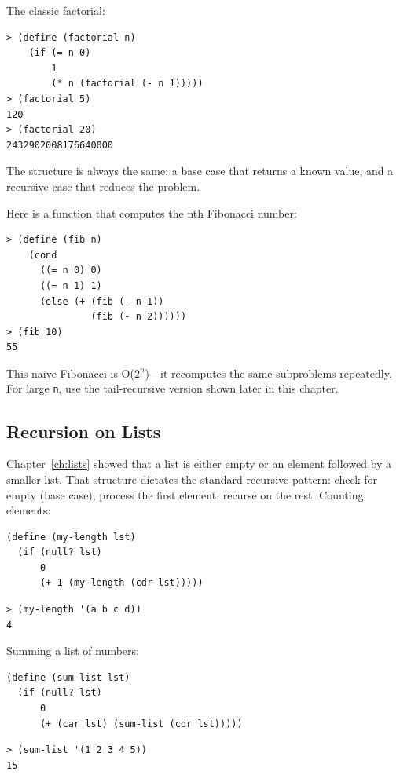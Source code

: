 The classic factorial:

\begin{lstlisting}[style=repl]
> (define (factorial n)
    (if (= n 0)
        1
        (* n (factorial (- n 1)))))
> (factorial 5)
120
> (factorial 20)
2432902008176640000
\end{lstlisting}

The structure is always the same: a base case that returns a known value, and a recursive case that reduces the problem.

Here is a function that computes the nth Fibonacci number:

\begin{lstlisting}[style=repl]
> (define (fib n)
    (cond
      ((= n 0) 0)
      ((= n 1) 1)
      (else (+ (fib (- n 1))
               (fib (- n 2))))))
> (fib 10)
55
\end{lstlisting}

\begin{warning}
This naive Fibonacci is O($2^n$)---it recomputes the same subproblems repeatedly. For large \texttt{n}, use the tail-recursive version shown later in this chapter.
\end{warning}

\subsection{Recursion on Lists}

Chapter~\ref{ch:lists} showed that a list is either empty or an element followed by a smaller list. That structure dictates the standard recursive pattern: check for empty (base case), process the first element, recurse on the rest. Counting elements:

\begin{lstlisting}
(define (my-length lst)
  (if (null? lst)
      0
      (+ 1 (my-length (cdr lst)))))
\end{lstlisting}

\begin{lstlisting}[style=repl]
> (my-length '(a b c d))
4
\end{lstlisting}

Summing a list of numbers:

\begin{lstlisting}
(define (sum-list lst)
  (if (null? lst)
      0
      (+ (car lst) (sum-list (cdr lst)))))
\end{lstlisting}

\begin{lstlisting}[style=repl]
> (sum-list '(1 2 3 4 5))
15
\end{lstlisting}

